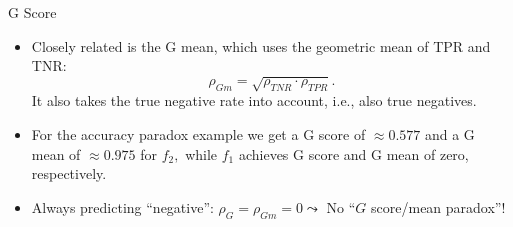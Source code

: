 \documentclass[11pt,compress,t,notes=noshow, xcolor=table]{beamer}
\begin{document}
\begin{vbframe}{G Score}
\begin{minipage}[c]{0.5\textwidth}
\end{minipage}
%
\begin{itemize}
	\item %
	Closely related is the G mean, which uses the geometric mean of TPR and TNR:
	$$\rho_{Gm} = \sqrt{\rho_{TNR} \cdot \rho_{TPR}}.$$
	It also takes the true negative rate into account, i.e., also true negatives.
%	
	\item For the accuracy paradox example we get a G score of $\approx 0.577$ and a G mean of $\approx 0.975$ for $f_2,$ while $f_1$ achieves G score and G mean of zero, respectively.
%	
	\item Always predicting \enquote{negative}: $\rho_{G} = \rho_{Gm}  = 0 \leadsto$ No ``$G$ score/mean paradox''!
%
\end{itemize}
	
\end{vbframe}
\end{document}
